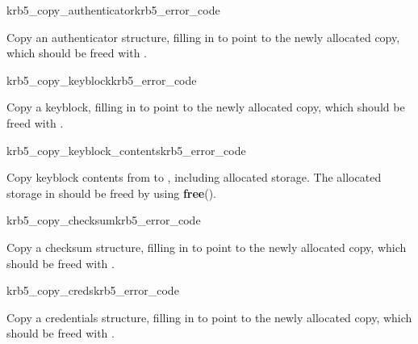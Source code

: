 \begin{funcdecl}{krb5_copy_authenticator}{krb5_error_code}{\funcinout}
\funcin
{}
\funcout
{}
\end{funcdecl}

Copy an authenticator structure, filling in  to
point to the newly allocated copy, which should be freed with 
.

\begin{funcdecl}{krb5_copy_keyblock}{krb5_error_code}{\funcinout}
\funcin
{}
\funcout
{}
\end{funcdecl}

Copy a keyblock, filling in  to point to the newly
allocated copy, which should be freed with
. 

\begin{funcdecl}{krb5_copy_keyblock_contents}{krb5_error_code}{\funcinout}
\funcin
{}
\funcout
{}
\end{funcdecl}

Copy keyblock contents from  to , including
allocated storage.  The allocated storage in  should be
freed by using {\bf free}().

\begin{funcdecl}{krb5_copy_checksum}{krb5_error_code}{\funcinout}
\funcin
{}
\funcout
{}
\end{funcdecl}

Copy a checksum structure, filling in  to point to
the newly allocated copy, which should be freed with
.

\begin{funcdecl}{krb5_copy_creds}{krb5_error_code}{\funcinout}
\funcin
{}
\funcout
{}
\end{funcdecl}

Copy a credentials structure, filling in  to point
to the newly allocated copy, which should be freed with
.

